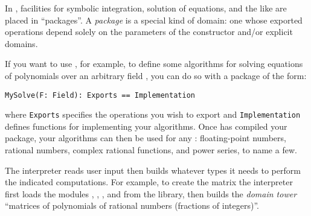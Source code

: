 
\par %
In \Language{}, facilities for symbolic integration, solution of equations, and the like
are placed in ``packages''.
A {\it package}
is a special kind of domain: one whose exported operations
depend solely on the parameters of the constructor and/or
explicit domains.

If you want to use \Language{}, for example, to define some algorithms for solving
equations of polynomials over an arbitrary field , you
can do so with a package of the form:

\begin{verbatim}
MySolve(F: Field): Exports == Implementation
\end{verbatim}

where {\tt Exports} specifies the  operations you wish to
export and {\tt Implementation} defines functions for implementing your algorithms.
Once \Language{} has compiled your package, your algorithms can then be used
for any : floating-point numbers, rational numbers, complex
rational functions, and power series, to name a few.



\par %
The \Language{} interpreter reads user input then builds whatever types
it needs to perform the indicated computations.
For example, to create the matrix
%
{}
%
the interpreter first loads the
modules , , ,
and  from the library, then builds the {\it domain tower}
``matrices of polynomials of rational numbers (fractions of integers)''.


